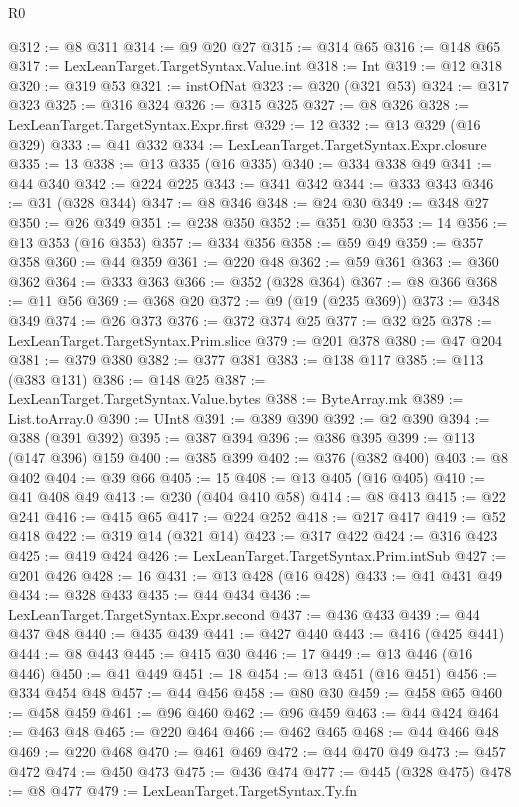\begin{lexlean}{R0}
\begin{coremodule}
@312 := @8 @311
@314 := @9 @20 @27
@315 := @314 @65
@316 := @148 @65
@317 := LexLeanTarget.TargetSyntax.Value.int
@318 := Int
@319 := @12 @318
@320 := @319 @53
@321 := instOfNat
@323 := @320 (@321 @53)
@324 := @317 @323
@325 := @316 @324
@326 := @315 @325
@327 := @8 @326
@328 := LexLeanTarget.TargetSyntax.Expr.first
@329 := 12
@332 := @13 @329 (@16 @329)
@333 := @41 @332
@334 := LexLeanTarget.TargetSyntax.Expr.closure
@335 := 13
@338 := @13 @335 (@16 @335)
@340 := @334 @338 @49
@341 := @44 @340
@342 := @224 @225
@343 := @341 @342
@344 := @333 @343
@346 := @31 (@328 @344)
@347 := @8 @346
@348 := @24 @30
@349 := @348 @27
@350 := @26 @349
@351 := @238 @350
@352 := @351 @30
@353 := 14
@356 := @13 @353 (@16 @353)
@357 := @334 @356
@358 := @59 @49
@359 := @357 @358
@360 := @44 @359
@361 := @220 @48
@362 := @59 @361
@363 := @360 @362
@364 := @333 @363
@366 := @352 (@328 @364)
@367 := @8 @366
@368 := @11 @56
@369 := @368 @20
@372 := @9 (@19 (@235 @369))
@373 := @348 @349
@374 := @26 @373
@376 := @372 @374 @25
@377 := @32 @25
@378 := LexLeanTarget.TargetSyntax.Prim.slice
@379 := @201 @378
@380 := @47 @204
@381 := @379 @380
@382 := @377 @381
@383 := @138 @117
@385 := @113 (@383 @131)
@386 := @148 @25
@387 := LexLeanTarget.TargetSyntax.Value.bytes
@388 := ByteArray.mk
@389 := List.toArray.{0}
@390 := UInt8
@391 := @389 @390
@392 := @2 @390
@394 := @388 (@391 @392)
@395 := @387 @394
@396 := @386 @395
@399 := @113 (@147 @396) @159
@400 := @385 @399
@402 := @376 (@382 @400)
@403 := @8 @402
@404 := @39 @66
@405 := 15
@408 := @13 @405 (@16 @405)
@410 := @41 @408 @49
@413 := @230 (@404 @410 @58)
@414 := @8 @413
@415 := @22 @241
@416 := @415 @65
@417 := @224 @252
@418 := @217 @417
@419 := @52 @418
@422 := @319 @14 (@321 @14)
@423 := @317 @422
@424 := @316 @423
@425 := @419 @424
@426 := LexLeanTarget.TargetSyntax.Prim.intSub
@427 := @201 @426
@428 := 16
@431 := @13 @428 (@16 @428)
@433 := @41 @431 @49
@434 := @328 @433
@435 := @44 @434
@436 := LexLeanTarget.TargetSyntax.Expr.second
@437 := @436 @433
@439 := @44 @437 @48
@440 := @435 @439
@441 := @427 @440
@443 := @416 (@425 @441)
@444 := @8 @443
@445 := @415 @30
@446 := 17
@449 := @13 @446 (@16 @446)
@450 := @41 @449
@451 := 18
@454 := @13 @451 (@16 @451)
@456 := @334 @454 @48
@457 := @44 @456
@458 := @80 @30
@459 := @458 @65
@460 := @458 @459
@461 := @96 @460
@462 := @96 @459
@463 := @44 @424
@464 := @463 @48
@465 := @220 @464
@466 := @462 @465
@468 := @44 @466 @48
@469 := @220 @468
@470 := @461 @469
@472 := @44 @470 @49
@473 := @457 @472
@474 := @450 @473
@475 := @436 @474
@477 := @445 (@328 @475)
@478 := @8 @477
@479 := LexLeanTarget.TargetSyntax.Ty.fn

\end{coremodule}
\end{lexlean}
